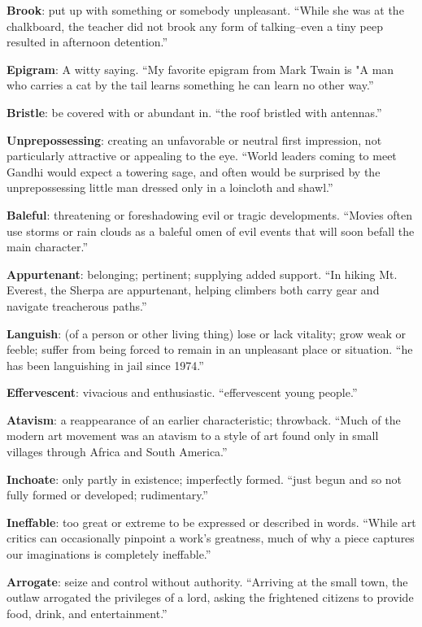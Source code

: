 \documentclass[12pt, a4paper]{ximera}
\begin{document}
\textbf{Brook}: put up with something or somebody unpleasant. ``While she was at the chalkboard, the teacher did not brook any form of talking--even a tiny peep resulted in afternoon detention.''

\textbf{Epigram}: A witty saying. ``My favorite epigram from Mark Twain is "A man who carries a cat by the tail learns something he can learn no other way.''

\textbf{Bristle}: be covered with or abundant in. ``the roof bristled with antennas.''

\textbf{Unprepossessing}: creating an unfavorable or neutral first impression, not particularly attractive or appealing to the eye. ``World leaders coming to meet Gandhi would expect a towering sage, and often would be surprised by the unprepossessing little man dressed only in a loincloth and shawl.''

\textbf{Baleful}: threatening or foreshadowing evil or tragic developments. ``Movies often use storms or rain clouds as a baleful omen of evil events that will soon befall the main character.''

\textbf{Appurtenant}: belonging; pertinent; supplying added support. ``In hiking Mt. Everest, the Sherpa are appurtenant, helping climbers both carry gear and navigate treacherous paths.''

\textbf{Languish}: (of a person or other living thing) lose or lack vitality; grow weak or feeble; suffer from being forced to remain in an unpleasant place or situation. ``he has been languishing in jail since 1974.''

\textbf{Effervescent}: vivacious and enthusiastic. ``effervescent young people.''

\textbf{Atavism}: a reappearance of an earlier characteristic; throwback. ``Much of the modern art movement was an atavism to a style of art found only in small villages through Africa and South America.''

\textbf{Inchoate}: only partly in existence; imperfectly formed. ``just begun and so not fully formed or developed; rudimentary.''

\textbf{Ineffable}: too great or extreme to be expressed or described in words. ``While art critics can occasionally pinpoint a work's greatness, much of why a piece captures our imaginations is completely ineffable.''

\textbf{Arrogate}: seize and control without authority. ``Arriving at the small town, the outlaw arrogated the privileges of a lord, asking the frightened citizens to provide food, drink, and entertainment.''
\end{document}
